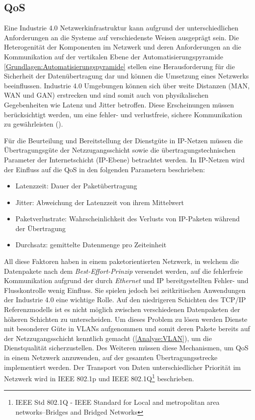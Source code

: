 \subsection{\ac{QoS}}
Eine Industrie 4.0 Netzwerkinfrastruktur kann aufgrund der unterschiedlichen Anforderungen an die Systeme auf verschiedenste Weisen ausgeprägt sein. Die Heterogenität der Komponenten im Netzwerk und deren Anforderungen an die Kommunikation auf der vertikalen Ebene der Automatisierungspyramide \autoref{Grundlagen:Automatisierungspyramide} stellen eine Herausforderung für die Sicherheit der Datenübertragung dar und können die Umsetzung eines Netzwerks beeinflussen. Industrie 4.0 Umgebungen können sich über weite Distanzen (\ac{MAN}, \ac{WAN} und \ac{GAN}) erstrecken und sind somit auch von physikalischen Gegebenheiten wie Latenz und Jitter betroffen. Diese Erscheinungen müssen berücksichtigt werden, um eine fehler- und verlustfreie, sichere Kommunikation zu gewährleisten (\cite{torscht2014}).

Für die Beurteilung und Bereitstellung der Dienstgüte in \ac{IP}-Netzen müssen die Übertragungsgüte der Netzzugangsschicht sowie die übertragungstechnischen Parameter der Internetschicht (\ac{IP}-Ebene) betrachtet werden. In IP-Netzen wird der Einfluss auf die \ac{QoS} in den folgenden Parametern beschrieben:

\begin{itemize}
    \item Latenzzeit: Dauer der Paketübertragung
    \item Jitter: Abweichung der Latenzzeit von ihrem Mittelwert
    \item Paketverlustrate: Wahrscheinlichkeit des Verlusts von IP-Paketen während der Übertragung
    \item Durchsatz: gemittelte Datenmenge pro Zeiteinheit
\end{itemize}

All diese Faktoren haben in einem paketorientierten Netzwerk, in welchem die Datenpakete nach dem \textit{Best-Effort-Prinzip} versendet werden, auf die fehlerfreie Kommunikation aufgrund der durch \textit{Ethernet} und \ac{IP} bereitgestellten Fehler- und Flusskontrolle wenig Einfluss. Sie spielen jedoch bei zeitkritischen Anwendungen der Industrie 4.0 eine wichtige Rolle. Auf den niedrigeren Schichten des \ac{TCP}/\ac{IP} Referenzmodells ist es nicht möglich zwischen verschiedenen Datenpaketen der höheren Schichten zu unterscheiden. Um dieses Problem zu lösen werden Dienste mit besonderer Güte in \ac{VLAN}s aufgenommen und somit deren Pakete bereits auf der Netzzugangsschicht kenntlich gemacht (\autoref{Analyse:VLAN}), um die Dienstqualität sicherzustellen. Des Weiteren müssen diese Mechanismen, um \ac{QoS} in einem Netzwerk anzuwenden, auf der gesamten Übertragungsstrecke implementiert werden. Der Transport von Daten unterschiedlicher Priorität im Netzwerk wird in \ac{IEEE} 802.1p und \ac{IEEE} 802.1Q\footnote{IEEE Std 802.1Q - IEEE Standard for Local and metropolitan area networks--Bridges and Bridged Networks} beschrieben.

